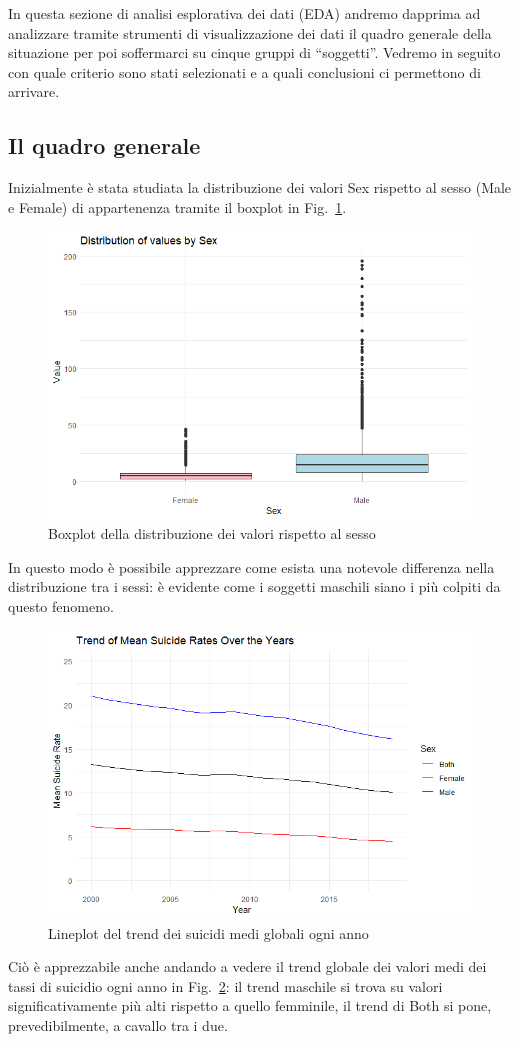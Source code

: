 \documentclass[conference]{IEEEtran}
\begin{document}
In questa sezione di analisi esplorativa dei dati (EDA) andremo dapprima
ad analizzare tramite strumenti di visualizzazione dei dati il quadro generale
della situazione per poi soffermarci su cinque gruppi di ``soggetti''.
Vedremo in seguito con quale criterio sono stati selezionati e a quali
conclusioni ci permettono di arrivare.

\subsection{Il quadro generale}

Inizialmente è stata studiata la distribuzione dei valori Sex rispetto
al sesso (Male e Female) di appartenenza tramite il boxplot in Fig.~\ref{1sex}.
\begin{figure}[htbp]
    \centerline{\includegraphics[width=.5\textwidth]{img/1 - Sex.png}}
    \caption{Boxplot della distribuzione dei valori rispetto al sesso}
    \label{1sex}
\end{figure}
In questo modo è possibile apprezzare come esista una notevole differenza
nella distribuzione tra i sessi: è evidente come i soggetti maschili siano
i più colpiti da questo fenomeno.

\begin{figure}[htbp]
    \centerline{\includegraphics[width=.5\textwidth]{img/2 - Globtrend.png}}
    \caption{Lineplot del trend dei suicidi medi globali ogni anno}
    \label{2globtrend}
\end{figure}
Ciò è apprezzabile anche andando a vedere il trend globale dei valori medi
dei tassi di suicidio ogni anno in Fig.~\ref{2globtrend}: il trend maschile
si trova su valori significativamente più alti rispetto a quello femminile,
il trend di Both si pone, prevedibilmente, a cavallo tra i due.
\end{document}
